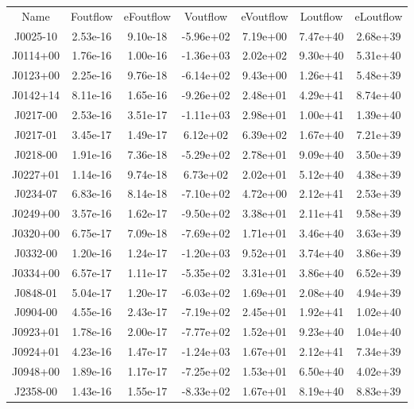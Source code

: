 \begin{table}
\begin{tabular}{ccccccc}
Name & Foutflow & eFoutflow & Voutflow & eVoutflow & Loutflow & eLoutflow \\
J0025-10 & 2.53e-16 & 9.10e-18 & -5.96e+02 & 7.19e+00 & 7.47e+40 & 2.68e+39 \\
J0114+00 & 1.76e-16 & 1.00e-16 & -1.36e+03 & 2.02e+02 & 9.30e+40 & 5.31e+40 \\
J0123+00 & 2.25e-16 & 9.76e-18 & -6.14e+02 & 9.43e+00 & 1.26e+41 & 5.48e+39 \\
J0142+14 & 8.11e-16 & 1.65e-16 & -9.26e+02 & 2.48e+01 & 4.29e+41 & 8.74e+40 \\
J0217-00 & 2.53e-16 & 3.51e-17 & -1.11e+03 & 2.98e+01 & 1.00e+41 & 1.39e+40 \\
J0217-01 & 3.45e-17 & 1.49e-17 & 6.12e+02 & 6.39e+02 & 1.67e+40 & 7.21e+39 \\
J0218-00 & 1.91e-16 & 7.36e-18 & -5.29e+02 & 2.78e+01 & 9.09e+40 & 3.50e+39 \\
J0227+01 & 1.14e-16 & 9.74e-18 & 6.73e+02 & 2.02e+01 & 5.12e+40 & 4.38e+39 \\
J0234-07 & 6.83e-16 & 8.14e-18 & -7.10e+02 & 4.72e+00 & 2.12e+41 & 2.53e+39 \\
J0249+00 & 3.57e-16 & 1.62e-17 & -9.50e+02 & 3.38e+01 & 2.11e+41 & 9.58e+39 \\
J0320+00 & 6.75e-17 & 7.09e-18 & -7.69e+02 & 1.71e+01 & 3.46e+40 & 3.63e+39 \\
J0332-00 & 1.20e-16 & 1.24e-17 & -1.20e+03 & 9.52e+01 & 3.74e+40 & 3.86e+39 \\
J0334+00 & 6.57e-17 & 1.11e-17 & -5.35e+02 & 3.31e+01 & 3.86e+40 & 6.52e+39 \\
J0848-01 & 5.04e-17 & 1.20e-17 & -6.03e+02 & 1.69e+01 & 2.08e+40 & 4.94e+39 \\
J0904-00 & 4.55e-16 & 2.43e-17 & -7.19e+02 & 2.45e+01 & 1.92e+41 & 1.02e+40 \\
J0923+01 & 1.78e-16 & 2.00e-17 & -7.77e+02 & 1.52e+01 & 9.23e+40 & 1.04e+40 \\
J0924+01 & 4.23e-16 & 1.47e-17 & -1.24e+03 & 1.67e+01 & 2.12e+41 & 7.34e+39 \\
J0948+00 & 1.89e-16 & 1.17e-17 & -7.25e+02 & 1.53e+01 & 6.50e+40 & 4.02e+39 \\
J2358-00 & 1.43e-16 & 1.55e-17 & -8.33e+02 & 1.67e+01 & 8.19e+40 & 8.83e+39 \\
\end{tabular}
\end{table}

